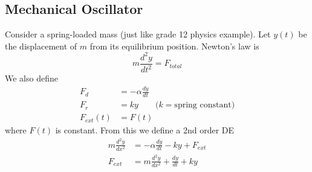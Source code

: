 \documentclass{report}
\begin{document}
\subsection{Mechanical Oscillator}
Consider a spring-loaded mass (just like grade 12 physics example). Let $y(t)$ be the displacement of $m$ from its equilibrium position. Newton's law is
$$m\frac{d^2y}{dt^2} = F_{total}$$
We also define
\begin{align*}
F_d &= -\alpha \frac{dy}{dt} \\
F_r &= ky \qquad (k=\text{spring constant)} \\
F_{ext}(t) &= F(t)
\end{align*}
where $F(t)$ is constant. From this we define a 2nd order DE
\begin{align*}
m\frac{d^2y}{dx^2} &= -\alpha \frac{dy}{dt} - ky + F_{ext} \\
F_{ext}  &= m\frac{d^2y}{dx^2} + \frac{dy}{dt} + ky
\end{align*}
\end{document}
